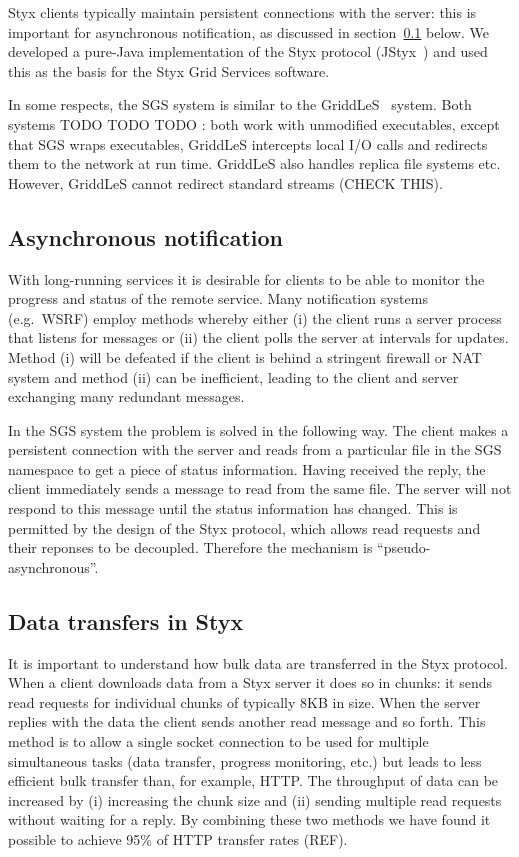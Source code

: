 \documentclass[a4paper]{article}
\begin{document}
Styx clients typically maintain persistent connections with the server: this is important for asynchronous notification, as discussed in section~\ref{sec:notification} below.  We developed a pure-Java implementation of the Styx protocol (JStyx~\cite{JStyx}) and used this as the basis for the Styx Grid Services software.

In some respects, the SGS system is similar to the GriddLeS~\cite{abramson:2004} system.  Both systems TODO TODO TODO : both work with unmodified executables, except that SGS wraps executables, GriddLeS intercepts local I/O calls and redirects them to the network at run time.  GriddLeS also handles replica file systems etc.  However, GriddLeS cannot redirect standard streams (CHECK THIS).

\subsection{Asynchronous notification}\label{sec:notification}
With long-running services it is desirable for clients to be able to monitor the progress and status of the remote service.  Many notification systems (e.g.\ WSRF) employ methods whereby either (i) the client runs a server process that listens for messages or (ii) the client polls the server at intervals for updates.  Method (i) will be defeated if the client is behind a stringent firewall or NAT system and method (ii) can be inefficient, leading to the client and server exchanging many redundant messages.

In the SGS system the problem is solved in the following way.  The client makes a persistent connection with the server and reads from a particular file in the SGS namespace to get a piece of status information.  Having received the reply, the client immediately sends a message to read from the same file.  The server will not respond to this message until the status information has changed.  This is permitted by the design of the Styx protocol, which allows read requests and their reponses to be decoupled.  Therefore the mechanism is ``pseudo-asynchronous''.

\subsection{Data transfers in Styx}
It is important to understand how bulk data are transferred in the Styx protocol.  When a client downloads data from a Styx server it does so in chunks: it sends read requests for individual chunks of typically 8KB in size.  When the server replies with the data the client sends another read message and so forth.  This method is to allow a single socket connection to be used for multiple simultaneous tasks (data transfer, progress monitoring, etc.) but leads to less efficient bulk transfer than, for example, HTTP.  The throughput of data can be increased by (i) increasing the chunk size and (ii) sending multiple read requests without waiting for a reply.  By combining these two methods we have found it possible to achieve 95\% of HTTP transfer rates (REF).
\end{document}
